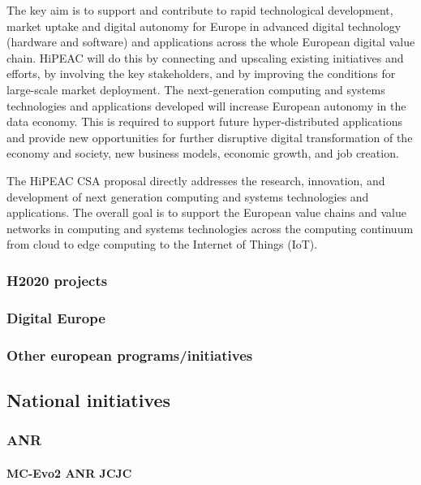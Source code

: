 \begin{description}
The key aim is to support and contribute to rapid technological development, market uptake and digital autonomy for Europe in advanced digital technology (hardware and software) and applications across the whole European digital value chain. HiPEAC will do this by connecting and upscaling existing initiatives and efforts, by involving the key stakeholders, and by improving the conditions for large-scale market deployment. The next-generation computing and systems technologies and applications developed will increase European autonomy in the data economy. This is required to support future hyper-distributed applications and provide new opportunities for further disruptive digital transformation of the economy and society, new business models, economic growth, and job creation.



The HiPEAC CSA proposal directly addresses the research, innovation, and development of next generation computing and systems technologies and applications. The overall goal is to support the European value chains and value networks in computing and systems technologies across the computing continuum from cloud to edge computing to the Internet of Things (IoT).
\end{description}

\subsubsection{H2020 projects}
\subsubsection{Digital Europe}
\subsubsection{Other european programs/initiatives}


\subsection{National initiatives}
\label{diverse:national-initiatives}

 \subsubsection{ANR}

\paragraph*{\label{project:MC-Evo}MC-Evo2 ANR JCJC}


